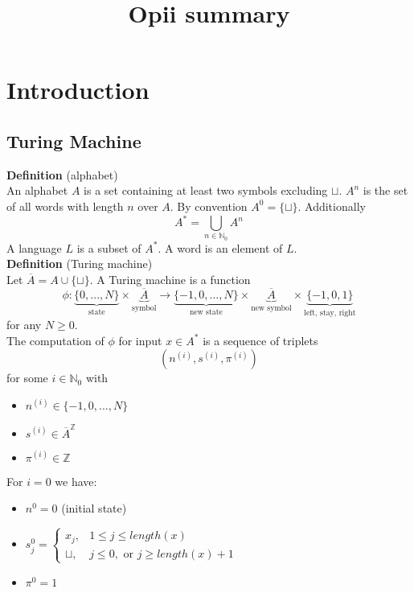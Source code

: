 \documentclass[a4paper, 12pt]{article}
\begin{document}
	\begin{titlepage} 
		\title{Opii summary}
		\clearpage\maketitle
		\thispagestyle{empty}
	\end{titlepage}
	\tableofcontents
	\section{Introduction}
	\subsection{Turing Machine}
	\textbf{Definition} (alphabet)\\
	An alphabet $A$ is a set containing at least two symbols excluding $\sqcup$. $A^n$ is the set of all words with length $n$ over $A$. By convention $A^0 = \{\sqcup\}$. Additionally \[A^* = \bigcup_{n \in \mathbb{N}_0} A^n\] A language $L$ is a subset of $A^*$. A word is an element of $L$.\\
	\textbf{Definition} (Turing machine)\\
	Let $\overline{A} = A \cup \{\sqcup\}$. A Turing machine is a function \[\phi : \underbrace{\{0,...,N\}}_{\text{state}} \times \underbrace{\overline{A}}_{\text{symbol}} \to \underbrace{\{-1, 0, ..., N\}}_{\text{new state}} \times \underbrace{\overline{A}}_{\text{new symbol}} \times \underbrace{\{-1, 0, 1\}}_{\text{left, stay, right}}\]
	for any $N \geq 0$.\\
	The computation of $\phi$ for input $x \in A^*$ is a sequence of triplets \[(n^{(i)}, s^{(i)}, \pi^{(i)})\]
	for some $i \in \mathbb{N}_0$ with \begin{itemize}
		\item $n^{(i)} \in \{-1, 0, ..., N\}$
		\item $s^{(i)} \in \overline{A}^\mathbb{Z}$
		\item $\pi^{(i)} \in \mathbb{Z}$ 
	\end{itemize}
	For $i = 0$ we have:\begin{itemize}
		\item $n^0 = 0$ (initial state)
		\item $s_j^0 = \begin{cases}
			x_j, & 1\leq j \leq length(x)\\
			\sqcup, & j \leq 0, \text{ or } j\geq length(x)+1
		\end{cases}$
		\item $\pi^0 = 1$
	\end{itemize} 
\end{document}
